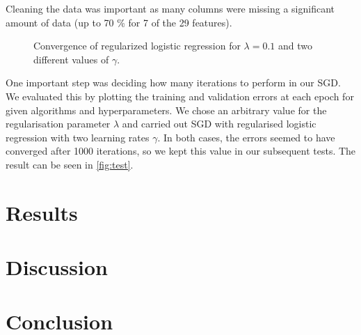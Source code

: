 \documentclass[10pt,conference,compsocconf]{IEEEtran}
\begin{document}

Cleaning the data was important as many columns were missing a significant amount of data (up to 70 \% for 7 of the 29 features).

\begin{figure}
  \centering
  
  \vspace{-3mm}
  \caption{Convergence of regularized logistic regression for $\lambda = 0.1$ and two
  different values of $\gamma$.}
  \label{fig:test}
\end{figure}


One important step was deciding how many iterations to perform in our
SGD. We evaluated this by plotting the training and validation errors
at each epoch for given algorithms and hyperparameters.
We chose an arbitrary value for the regularisation parameter $\lambda$ and carried out SGD with regularised logistic regression with two learning rates $\gamma$.
In both cases, the errors seemed to have converged after 1000 iterations, so we kept this value in our subsequent tests.
The result can
be seen in \autoref{fig:test}.

\section{Results}

\section{Discussion}

\section{Conclusion}




\end{document}
